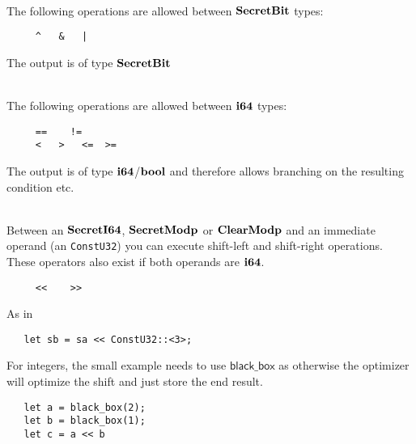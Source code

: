 ~ \\

\noindent
The following operations are allowed between $\mathbf{SecretBit}$ types:
\begin{verbatim}
     ^   &   |
\end{verbatim}
The output is of type $\mathbf{SecretBit}$

~\\

\noindent
The following operations are allowed between $\mathbf{i64}$ types:
\begin{verbatim}
     ==    !=
     <   >   <=  >=
\end{verbatim}
The output is of type $\mathbf{i64}$/$\mathbf{bool}$ and therefore allows branching
on the resulting condition etc.


~ \\

\noindent
Between an $\mathbf{SecretI64}$, $\mathbf{SecretModp}$ or $\mathbf{ClearModp}$ and an immediate operand (an \verb|ConstU32|)
you can execute shift-left and shift-right operations. These operators also exist if both operands
are $\mathbf{i64}$.
\begin{verbatim}
     <<    >>
\end{verbatim}
As in
\begin{lstlisting}
   let sb = sa << ConstU32::<3>;
\end{lstlisting}
For integers, the small example needs to use $\mathsf{black\_box}$ 
as otherwise the optimizer will optimize the shift and just store 
the end result.
\begin{lstlisting}
   let a = black_box(2);
   let b = black_box(1);
   let c = a << b
\end{lstlisting}

